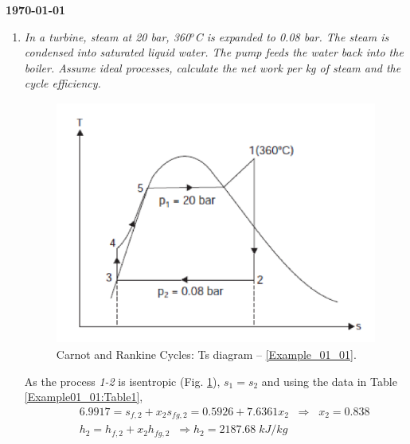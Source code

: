 \documentclass[12pts,a4paper,amsmath,amssymb,floatfix]{article}%
\begin{document}
\begin{flushright}
{\bf \today}
\end{flushright}


\begin{enumerate}[label=\bfseries Example \arabic*]

\item {\it In a turbine, steam at 20 bar, 360$^{o}$C is expanded to 0.08 bar. The steam is condensed into saturated liquid water. The pump feeds the water back into the boiler. Assume ideal processes, calculate the net work per kg of steam and the cycle efficiency.}\label{Example_01_01}

\begin{figure}[h]
\begin{center}
\includegraphics[width=13.0cm,height=8.0cm]{./../../ThermalEngines/Pics/example01_01}
\end{center}
\caption{Carnot and Rankine Cycles: Ts diagram -- \ref{Example_01_01}.}
\label{Example01_01:Pic1}
\end{figure}

As the process {\it 1-2} is isentropic (Fig. \ref{Example01_01:Pic1}), $s_{1}=s_{2}$ and using the data in Table \ref{Example01_01:Table1},
\begin{eqnarray}
&& 6.9917 = s_{f,2}+x_{2}s_{fg,2} = 0.5926 + 7.6361 x_{2} \;\; \Longrightarrow \;\; x_{2}= 0.838 \nonumber \\
&& h_{2} = h_{f,2}+ x_{2}h_{fg,2} \;\; \Longrightarrow h_{2}=2187.68\;kJ/kg \nonumber
\end{eqnarray}


\end{enumerate}
\end{document}
